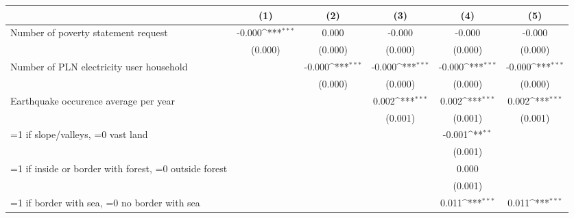 {
\def\sym#1{\ifmmode^{#1}\else\(^{#1}\)\fi}
\begin{tabular}{l*{5}{c}}
\toprule
                    &\multicolumn{1}{c}{(1)}         &\multicolumn{1}{c}{(2)}         &\multicolumn{1}{c}{(3)}         &\multicolumn{1}{c}{(4)}         &\multicolumn{1}{c}{(5)}         \\
\midrule
\hspace{0.25cm} Number of poverty statement request&      -0.000\sym{***}&       0.000         &      -0.000         &      -0.000         &      -0.000         \\
                    &     (0.000)         &     (0.000)         &     (0.000)         &     (0.000)         &     (0.000)         \\
\addlinespace
\hspace{0.25cm} Number of PLN electricity user household&                     &      -0.000\sym{***}&      -0.000\sym{***}&      -0.000\sym{***}&      -0.000\sym{***}\\
                    &                     &     (0.000)         &     (0.000)         &     (0.000)         &     (0.000)         \\
\addlinespace
\hspace{0.25cm} Earthquake occurence average per year&                     &                     &       0.002\sym{***}&       0.002\sym{***}&       0.002\sym{***}\\
                    &                     &                     &     (0.001)         &     (0.001)         &     (0.001)         \\
\addlinespace
\hspace{0.25cm} =1 if slope/valleys, =0 vast land&                     &                     &                     &      -0.001\sym{**} &                     \\
                    &                     &                     &                     &     (0.001)         &                     \\
\addlinespace
\hspace{0.25cm} =1 if inside or border with forest, =0 outside forest&                     &                     &                     &       0.000         &                     \\
                    &                     &                     &                     &     (0.001)         &                     \\
\addlinespace
\hspace{0.25cm} =1 if border with sea, =0 no border with sea&                     &                     &                     &       0.011\sym{***}&       0.011\sym{***}\\

\end{tabular}}
